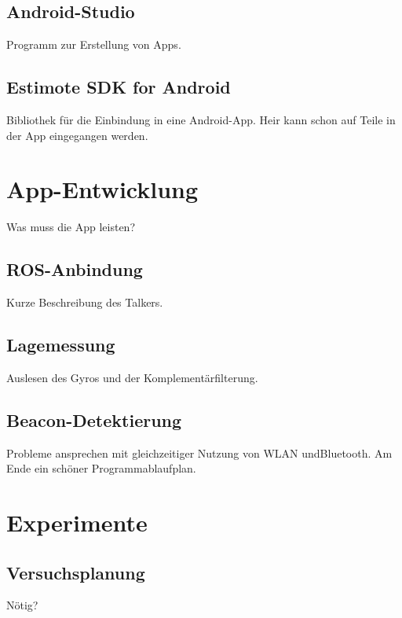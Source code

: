 \subsection{Android-Studio}
Programm zur Erstellung von Apps.
\subsection{Estimote SDK for Android}
Bibliothek für die Einbindung in eine Android-App. Heir kann schon auf Teile in der App eingegangen werden.
\section{App-Entwicklung}
Was muss die App leisten?
\subsection{ROS-Anbindung}
Kurze Beschreibung des Talkers.
\subsection{Lagemessung}
Auslesen des Gyros und der Komplementärfilterung.
\subsection{Beacon-Detektierung}
Probleme ansprechen mit gleichzeitiger Nutzung von WLAN undBluetooth. Am Ende ein schöner Programmablaufplan.

\section{Experimente}
\subsection{Versuchsplanung}
Nötig?

